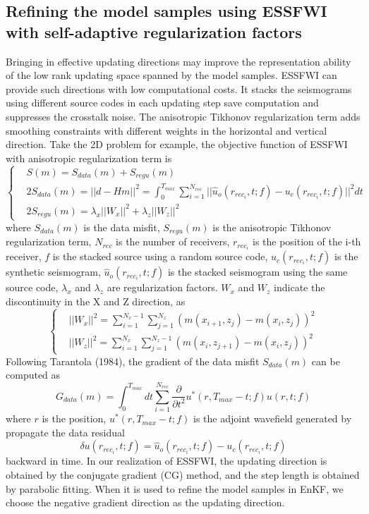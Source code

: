 \documentclass[mreferee]{gji}
\begin{document}
\subsection{Refining the model samples using ESSFWI with self-adaptive regularization factors}
Bringing in effective updating directions may improve the representation ability of the low rank updating space spanned by the model samples. ESSFWI can provide such directions with low computational costs. It stacks the seismograms using different source codes in each updating step save computation and suppresses the crosstalk noise. The anisotropic Tikhonov regularization term adds smoothing constraints with different weights in the horizontal and vertical direction. Take the 2D problem for example, the objective function of ESSFWI with anisotropic regularization term is
\begin{equation}
\left\{
\begin{aligned}
& S(m)=S_{data}(m)+S_{regu}(m) \\
& 2S_{data}(m)=||d-Hm||^2=\int_{0}^{T_{max}}\sum_{i=1}^{N_{rec}}||\hat u_o(r_{rec_i},t;f)-u_c(r_{rec_i},t;f)||^2dt \\
& 2S_{regu}(m)=\lambda_x||W_x||^2+\lambda_z||W_z||^2
\end{aligned}
\right.
\end{equation}
where $S_{data}(m)$ is the data misfit, $S_{regu}(m)$ is the anisotropic Tikhonov regularization term, $N_{rec}$ is the number of receivers, $r_{rec_i}$ is the position of the i-th receiver, $f$ is the stacked source using a random source code, $u_c(r_{rec_i},t;f)$ is the synthetic seismogram, $\hat u_o(r_{rec_i},t;f)$ is the stacked seismogram using the same source code, $\lambda_x$ and $\lambda_z$ are regularization factors. $W_x$ and $W_z$ indicate the discontinuity in the X and Z direction, as
\begin{equation}
\left\{
\begin{aligned}
& ||W_x||^2=\sum_{i=1}^{N_x-1}\sum_{j=1}^{N_z}\left(m(x_{i+1},z_j)-m(x_i,z_j)\right)^2 \\
& ||W_z||^2=\sum_{i=1}^{N_x}\sum_{j=1}^{N_z-1}\left(m(x_i,z_{j+1})-m(x_i,z_j)\right)^2
\end{aligned}
\right.
\end{equation}
Following Tarantola (1984), the gradient of the data misfit $S_{data}(m)$ can be computed as
\begin{equation}
G_{data}(m)=\int_{0}^{T_{max}}dt\sum_{i=1}^{N_{rec}}\frac{\partial}{\partial t^2}u^*(r,T_{max}-t;f)u(r,t;f)
\end{equation}
where $r$ is the position, $u^*(r,T_{max}-t;f)$ is the adjoint wavefield generated by propagate the data residual 
\begin{equation}
\delta u(r_{rec_i},t;f)=\hat u_o(r_{rec_i},t;f)-u_c(r_{rec_i},t;f)
\end{equation}
backward in time.
In our realization of ESSFWI, the updating direction is obtained by the conjugate gradient (CG) method, and the step length is obtained by parabolic fitting. When it is used to refine the model samples in EnKF, we choose the negative gradient direction as the updating direction.
\end{document}
